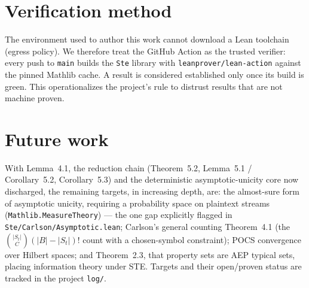 \documentclass[11pt]{article}
\begin{document}
\section{Verification method}
The environment used to author this work cannot download a Lean toolchain
(egress policy). We therefore treat the GitHub Action as the trusted
verifier: every push to \texttt{main} builds the \texttt{Ste} library
with \texttt{leanprover/lean-action} against the pinned Mathlib cache. A
result is considered established only once its build is green. This
operationalizes the project's rule to distrust results that are not
machine proven.

\section{Future work}
With Lemma~4.1, the reduction chain (Theorem~5.2, Lemma~5.1 /
Corollary~5.2, Corollary~5.3) and the deterministic asymptotic-unicity
core now discharged, the remaining targets, in increasing
depth, are: the almost-sure form of asymptotic unicity, requiring a
probability space on plaintext streams
(\texttt{Mathlib.MeasureTheory}) --- the one gap explicitly flagged in
\texttt{Ste/Carlson/Asymptotic.lean}; Carlson's general counting
Theorem~4.1 (the
$\binom{|S_t|}{C}(|B|-|S_t|)!$ count with a chosen-symbol constraint);
POCS convergence over Hilbert spaces; and Theorem~2.3, that property
sets are AEP typical sets, placing information theory under STE. Targets
and their open/proven status are tracked in the project \texttt{log/}.



\end{document}
